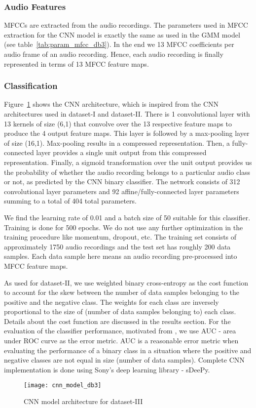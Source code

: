\subsubsection{Audio Features}
MFCCs are extracted from the audio recordings. The parameters used in MFCC extraction for the CNN model is exactly the same as used in the GMM model (see table~\ref{tab:param_mfcc_db3}). In the end we 13 MFCC coefficients per audio frame of an audio recording. Hence, each audio recording is finally represented in terms of 13 MFCC feature maps.

\subsubsection{Classification}

Figure~\ref{fig:cnn_model_db3} shows the CNN architecture, which is inspired from the CNN architectures used in dataset-I and dataset-II. There is 1 convolutional layer with 13 kernels of size (6,1) that convolve over the 13 respective feature maps to produce the 4 output feature maps. This layer is followed by a max-pooling layer of size (16,1). Max-pooling results in a compressed representation. Then, a fully-connected layer provides a single unit output from this compressed representation. Finally, a sigmoid transformation over the unit output provides us the probability of whether the audio recording belongs to a particular audio class or not, as predicted by the CNN binary classifier. The network consists of 312 convolutional layer parameters and 92 affine/fully-connected layer parameters summing to a total of 404 total parameters.

We find the learning rate of 0.01 and a batch size of 50 suitable for this classifier. Training is done for 500 epochs. We do not use any further optimization in the training procedure like momentum, dropout, etc. The training set consists of approximately 1750 audio recordings and the test set has roughly 200 data samples. Each data sample here means an audio recording pre-processed into MFCC feature maps.

As used for dataset-II, we use weighted binary cross-entropy as the cost function to account for the skew between the number of data samples belonging to the positive and the negative class. The weights for each class are inversely proportional to the size of (number of data samples belonging to) each class. Details about the cost function are discussed in the results section. For the evaluation of the classifier performance, motivated from \cite{foster2015chime}, we use AUC - area under ROC curve as the error metric. AUC is a reasonable error metric when evaluating the performance of a binary class in a situation where the positive and negative classes are not equal in size (number of data samples). Complete CNN implementation is done using Sony's deep learning library - sDeePy.

\begin{figure}[!htb] 
\centering 
\texttt{[image: cnn\_model\_db3]}
\caption[CNN model architecture for dataset-III]{CNN model architecture for dataset-III}
\label{fig:cnn_model_db3} 
\end{figure}
